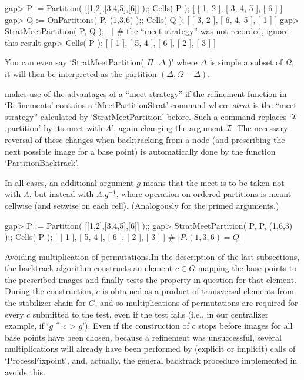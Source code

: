 \beginexample
gap> P := Partition( [[1,2],[3,4,5],[6]] );;  Cells( P );
[ [ 1, 2 ], [ 3, 4, 5 ], [ 6 ] ]
gap> Q := OnPartitions( P, (1,3,6) );;  Cells( Q );
[ [ 3, 2 ], [ 6, 4, 5 ], [ 1 ] ]
gap> StratMeetPartition( P, Q );
[  ]  # the ``meet strategy'' was not recorded, ignore this result
gap> Cells( P );
[ [ 1 ], [ 5, 4 ], [ 6 ], [ 2 ], [ 3 ] ]
\endexample

You can even say  `StratMeetPartition( $\Pi$, $\Delta$ )'  where $\Delta$
is simple  a subset  of  $\Omega$, it   will then  be interpreted as  the
partition $(\Delta,\Omega-\Delta)$.

{\GAP} makes use   of  the advantages  of   a ``meet  strategy''  if  the
refinement   function  in `Refinements'  contains  a `MeetPartitionStrat'
command where   $strat$  is   the    ``meet  strategy''  calculated    by
`StratMeetPartition' before.  Such a command replaces `${\cal I}$.partition' by
its meet with $\Lambda'$, again changing the argument ${\cal I}$. The necessary
reversal of these changes when backtracking from  a node (and prescribing
the next possible image  for a base point) is  automatically done by  the
function `PartitionBacktrack'.

In  all cases, an additional  argument $g$ means that the   meet is to be
taken  not with $\Lambda$,   but  instead with $\Lambda.{g^{-1}}$,  where
operation  on ordered partitions is  meant cellwise  (and setwise on each
cell). (Analogously for the primed arguments.)

\beginexample
gap> P := Partition( [[1,2],[3,4,5],[6]] );;
gap> StratMeetPartition( P, P, (1,6,3) );;  Cells( P );
[ [ 1 ], [ 5, 4 ], [ 6 ], [ 2 ], [ 3 ] ]  # |$P.(1,3,6) = Q|$
\endexample

{\bsf Avoiding multiplication  of permutations.}\quad In the  description
of  the last subsections, the  backtrack  algorithm constructs an element
$c\in G$ mapping  the base points   to the prescribed images  and finally
tests the property in question for that element. During the construction,
$c$ is obtained as a product  of transversal elements from the stabilizer
chain for $G$,  and so multiplications  of permutations are required  for
every $c$  submitted to the test,  even if the  test fails (i.e.,  in our
centralizer example, if `$g$ ^ $c$ \<> $g$'). Even if the construction of
$c$ stops before images  for all base  points have been chosen, because a
refinement was unsuccessful,  several  multiplications will  already have
been performed by (explicit or implicit) calls of `ProcessFixpoint', and,
actually, the general   backtrack procedure implemented in  {\GAP} avoids
this.

